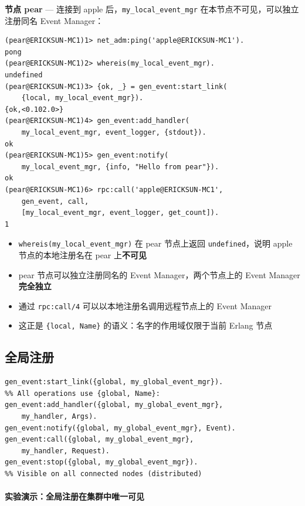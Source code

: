 \documentclass[a4paper,11pt]{article}
\begin{document}
\textbf{节点 pear} --- 连接到 apple 后，\texttt{my\_local\_event\_mgr} 在本节点不可见，可以独立注册同名 Event Manager：

\begin{lstlisting}[style=shellstyle, caption={pear 节点 --- 独立注册同名 Event Manager}]
(pear@ERICKSUN-MC1)1> net_adm:ping('apple@ERICKSUN-MC1').
pong
(pear@ERICKSUN-MC1)2> whereis(my_local_event_mgr).
undefined
(pear@ERICKSUN-MC1)3> {ok, _} = gen_event:start_link(
    {local, my_local_event_mgr}).
{ok,<0.102.0>}
(pear@ERICKSUN-MC1)4> gen_event:add_handler(
    my_local_event_mgr, event_logger, {stdout}).
ok
(pear@ERICKSUN-MC1)5> gen_event:notify(
    my_local_event_mgr, {info, "Hello from pear"}).
ok
(pear@ERICKSUN-MC1)6> rpc:call('apple@ERICKSUN-MC1',
    gen_event, call,
    [my_local_event_mgr, event_logger, get_count]).
1
\end{lstlisting}

\begin{tipbox}[本地注册的关键特性]
\begin{itemize}[leftmargin=1.5em]
    \item \texttt{whereis(my\_local\_event\_mgr)} 在 pear 节点上返回 \texttt{undefined}，说明 apple 节点的本地注册名在 pear 上\textbf{不可见}
    \item pear 节点可以独立注册同名的 Event Manager，两个节点上的 Event Manager \textbf{完全独立}
    \item 通过 \texttt{rpc:call/4} 可以以本地注册名调用远程节点上的 Event Manager
    \item 这正是 \texttt{\{local, Name\}} 的语义：名字的作用域仅限于当前 Erlang 节点
\end{itemize}
\end{tipbox}

\subsection{全局注册}

\begin{lstlisting}[style=erlangstyle]
gen_event:start_link({global, my_global_event_mgr}).
%% All operations use {global, Name}:
gen_event:add_handler({global, my_global_event_mgr},
    my_handler, Args).
gen_event:notify({global, my_global_event_mgr}, Event).
gen_event:call({global, my_global_event_mgr},
    my_handler, Request).
gen_event:stop({global, my_global_event_mgr}).
%% Visible on all connected nodes (distributed)
\end{lstlisting}

\paragraph{实验演示：全局注册在集群中唯一可见}
\end{document}
